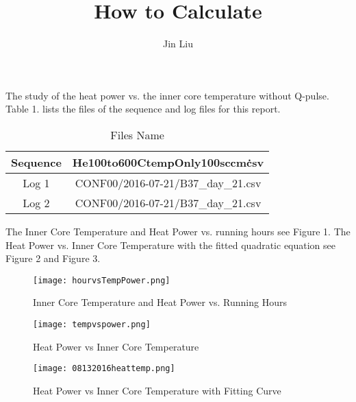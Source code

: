 \documentclass{article}
\title{How to Calculate }
\author{Jin Liu}
\begin{document}
\maketitle


The study of the heat power vs. the inner core temperature without Q-pulse.\\
Table 1. lists the files of the sequence and log files for this report.

\begin{table}
[h]
\centering
\caption{Files Name}
\begin{tabular}{|c|c|}
\hline
Sequence & He100to600CtempOnly100sccm\.csv\\ \hline
Log 1 & CONF00/2016-07-21/B37\_day\_21.csv\\  \hline
Log 2 & CONF00/2016-07-21/B37\_day\_21.csv\\ \hline
\end{tabular}
\end{table}


The Inner Core Temperature and Heat Power vs. running hours see Figure 1. 
The Heat Power vs. Inner Core Temperature with the fitted quadratic equation see Figure 2 and Figure 3. 


\begin{figure}
[h]
\begin{center}
\texttt{[image: hourvsTempPower.png]} 
\caption{Inner Core Temperature and Heat Power vs. Running Hours}%
\end{center}
\end{figure}

\begin{figure}
[h]
\begin{center}
\texttt{[image: tempvspower.png]} 
\caption{Heat Power vs Inner Core Temperature}%
\end{center}
\end{figure}
\begin{figure}
[h]
\begin{center}
\texttt{[image: 08132016heattemp.png]} 
\caption{Heat Power vs Inner Core Temperature with Fitting Curve}%
\end{center}
\end{figure}
\end{document}

